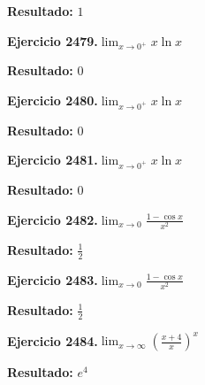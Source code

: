 \documentclass[10pt,a4paper]{article}
\begin{document}
\begin{solbox}
\textbf{Resultado:} \(\displaystyle 1\)
\end{solbox}

\begin{ejbox}
\textbf{Ejercicio 2479.}\quad $\lim_{x\to 0^+} x\ln x$
\end{ejbox}

\begin{solbox}
\textbf{Resultado:} \(\displaystyle 0\)
\end{solbox}

\begin{ejbox}
\textbf{Ejercicio 2480.}\quad $\lim_{x\to 0^+} x\ln x$
\end{ejbox}

\begin{solbox}
\textbf{Resultado:} \(\displaystyle 0\)
\end{solbox}

\newpage
\begin{ejbox}
\textbf{Ejercicio 2481.}\quad $\lim_{x\to 0^+} x\ln x$
\end{ejbox}

\begin{solbox}
\textbf{Resultado:} \(\displaystyle 0\)
\end{solbox}

\begin{ejbox}
\textbf{Ejercicio 2482.}\quad $\lim_{x\to 0} \frac{1-\cos x}{x^2}$
\end{ejbox}

\begin{solbox}
\textbf{Resultado:} \(\displaystyle \frac{1}{2}\)
\end{solbox}

\begin{ejbox}
\textbf{Ejercicio 2483.}\quad $\lim_{x\to 0} \frac{1-\cos x}{x^2}$
\end{ejbox}

\begin{solbox}
\textbf{Resultado:} \(\displaystyle \frac{1}{2}\)
\end{solbox}

\newpage
\begin{ejbox}
\textbf{Ejercicio 2484.}\quad $\lim_{x\to \infty} \left(\frac{x+4}{x}\right)^{x}$
\end{ejbox}

\begin{solbox}
\textbf{Resultado:} \(\displaystyle e^{4}\)
\end{solbox}
\end{document}
